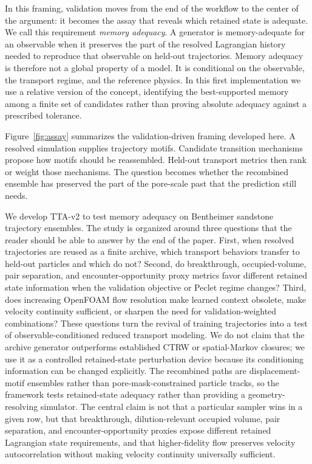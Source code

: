 \documentclass[11pt]{article}
\newcommand{\tta}{TTA-v2}
\begin{document}
In this framing, validation moves from the end of the workflow to the center of the argument: it becomes the assay that reveals which retained state is adequate. We call this requirement \emph{memory adequacy}. A generator is memory-adequate for an observable when it preserves the part of the resolved Lagrangian history needed to reproduce that observable on held-out trajectories. Memory adequacy is therefore not a global property of a model. It is conditional on the observable, the transport regime, and the reference physics. In this first implementation we use a relative version of the concept, identifying the best-supported memory among a finite set of candidates rather than proving absolute adequacy against a prescribed tolerance.

Figure~\ref{fig:assay} summarizes the validation-driven framing developed here. A resolved simulation supplies trajectory motifs. Candidate transition mechanisms propose how motifs should be reassembled. Held-out transport metrics then rank or weight those mechanisms. The question becomes whether the recombined ensemble has preserved the part of the pore-scale past that the prediction still needs.

We develop \tta{} to test memory adequacy on Bentheimer sandstone trajectory ensembles. The study is organized around three questions that the reader should be able to answer by the end of the paper. First, when resolved trajectories are reused as a finite archive, which transport behaviors transfer to held-out particles and which do not? Second, do breakthrough, occupied-volume, pair separation, and encounter-opportunity proxy metrics favor different retained state information when the validation objective or Peclet regime changes? Third, does increasing OpenFOAM flow resolution make learned context obsolete, make velocity continuity sufficient, or sharpen the need for validation-weighted combinations? These questions turn the revival of training trajectories into a test of observable-conditioned reduced transport modeling. We do not claim that the archive generator outperforms established CTRW or spatial-Markov closures; we use it as a controlled retained-state perturbation device because its conditioning information can be changed explicitly. The recombined paths are displacement-motif ensembles rather than pore-mask-constrained particle tracks, so the framework tests retained-state adequacy rather than providing a geometry-resolving simulator. The central claim is not that a particular sampler wins in a given row, but that breakthrough, dilution-relevant occupied volume, pair separation, and encounter-opportunity proxies expose different retained Lagrangian state requirements, and that higher-fidelity flow preserves velocity autocorrelation without making velocity continuity universally sufficient.
\end{document}
